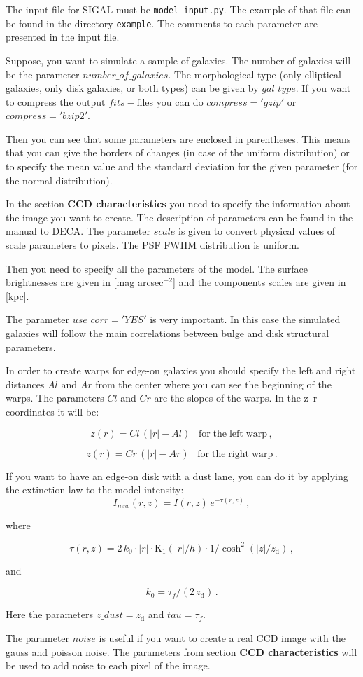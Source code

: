 \documentclass[
aps,%
12pt,%
final,%
notitlepage,%
oneside,%
onecolumn,%
nobibnotes,%
nofootinbib,%
superscriptaddress,%
noshowpacs,%
centertags]%
{revtex4}
\begin{document}
The input file for SIGAL must be \texttt{model\_input.py}. The example of that file can be found in the directory \texttt{example}. The comments to each parameter are presented in the input file. 

Suppose, you want to simulate a sample of galaxies. The number of galaxies will be the parameter $number\_of\_galaxies$. The morphological type (only elliptical galaxies, only disk galaxies, or both types) can be given by $gal\_type$. If you want to compress the output $fits-$files you can do $compress = 'gzip'$ or $compress = 'bzip2'$. 

Then you can see that some parameters are enclosed in parentheses. This means that you can give the borders of changes (in case of the uniform distribution) or to specify the mean value and the standard deviation for the given parameter (for the normal distribution). 

In the section \textbf{CCD characteristics} you need to specify the information about the image you want to create. The description of parameters can be found in the manual to DECA.  The parameter $scale$ is given to convert physical values of scale parameters to pixels. The PSF FWHM distribution is uniform. 

Then you need to specify all the parameters of the model. The surface brightnesses are given in [mag arcsec$^{-2}$] and the components scales are given in [kpc]. 

The parameter $use\_corr='YES'$ is very important. In this case the simulated galaxies will follow the main correlations between bulge and disk structural parameters.

In order to create warps for edge-on galaxies you should specify the left and right distances $Al$ and $Ar$ from the center where you can see the beginning of the warps. The parameters $Cl$ and $Cr$ are the slopes of the warps. In the z--r coordinates it will be:

\[
z(r) =  Cl\,(|r|-Al)\;\;\; \mathrm{for\;the\;left\;warp}\,,
\]

\[
z(r) =  Cr\,(|r|-Ar)\;\;\; \mathrm{for\;the\;right\;warp}\,. 
\]

If you want to have an edge-on disk with a dust lane, you can do it by applying the extinction law to the model intensity:
\[
I_{new}(r,z) = I(r,z)\,e^{-\tau(r,z)}\,,
\] 

where 

\[
\tau (r,z) = 2\,k_0\cdot|r|\cdot\mathrm{K_1}(|r|/h)\cdot 1/ \cosh^2(|z|/z_\mathrm{d})\,,
\]

and

\[
k_0 = \tau_f/(2\,z_\mathrm{d})\,.
\]

Here the parameters $z\_dust=z_\mathrm{d}$ and $tau=\tau_f$.

The parameter $noise$ is useful if you want to create a real CCD image with the gauss and poisson noise. The parameters from section \textbf{CCD characteristics} will be used to add noise to each pixel of the image.
\end{document}
